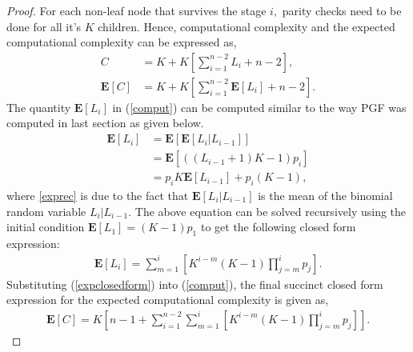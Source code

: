 \documentclass{article}
\begin{document}
\begin{proof}
For each non-leaf node that survives the stage $i,$ parity checks need to be done for all it's $K$ children. Hence, computational complexity and the expected computational complexity can be expressed as,
\begin{align}
C &= K + K\left[\sum_{i=1}^{n-2}L_i + n - 2\right], \nonumber \\
\mathbf{E}[C] &= K + K\left[ \sum_{i=1}^{n-2}\mathbf{E}[L_i] + n - 2\right]. \label{comput}
\end{align}
The quantity $\mathbf{E}[L_i]$ in (\ref{comput}) can be computed similar to the way PGF was computed in last section as given below.
\begin{align}
\mathbf{E}[L_i] &= \mathbf{E}[ \mathbf{E}[L_i \lvert L_{i-1}]] \nonumber \\
&= \mathbf{E}[((L_{i-1}+1)K-1)p_i] \label{exprec} \\
&= p_iK\mathbf{E}[L_{i-1}] + p_i(K-1), \nonumber
\end{align}
where \eqref{exprec} is due to the fact that $\mathbf{E}[L_{i} \lvert L_{i-1}]$ is the mean of the binomial random variable $L_{i} \lvert L_{i-1}$. The above equation can be solved recursively using the initial condition $\mathbf{E}[L_{1} ]= (K-1)p_1$ to get the following closed form expression:
\begin{align}
\mathbf{E}[L_{i}] = \sum_{m=1}^{i} \left[K^{i-m}(K-1) \prod_{j=m}^{i}p_j\right]. \label{expclosedform}
\end{align}
Substituting (\ref{expclosedform}) into (\ref{comput}), the final succinct closed form expression for the expected computational complexity is given as,
\begin{align}
\mathbf{E}[C] = K \left[n-1 + \sum_{i=1}^{n-2}\sum_{m=1}^{i} \left[K^{i-m}(K-1) \prod_{j=m}^{i}p_j\right]\right]. \label{expcompucomplexity}
\end{align}
\end{proof}
\fi
\end{document}
